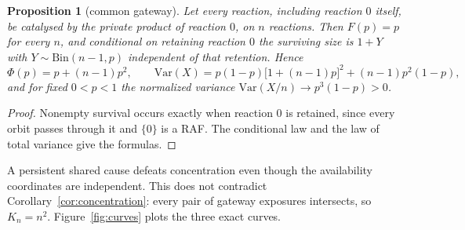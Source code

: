 \documentclass[11pt,a4paper]{article}
\theoremstyle{plain}
\newtheorem{proposition}[theorem]{Proposition}
\theoremstyle{definition}
\theoremstyle{remark}
\newcommand{\Var}{\mathrm{Var}}
\begin{document}
\begin{proposition}[common gateway]\label{prop:gateway}
Let every reaction, including reaction $0$ itself, be catalysed by the private product of reaction $0$, on $n$ reactions. Then $F(p)=p$ for every $n$, and conditional on retaining reaction $0$ the surviving size is $1+Y$ with $Y\sim\mathrm{Bin}(n-1,p)$ independent of that retention. Hence
\[
\Phi(p)=p+(n-1)p^{2},\qquad
\Var(X)=p(1-p)\big[1+(n-1)p\big]^{2}+(n-1)p^{2}(1-p),
\]
and for fixed $0<p<1$ the normalized variance $\Var(X/n)\to p^{3}(1-p)>0$.
\end{proposition}

\begin{proof}
Nonempty survival occurs exactly when reaction $0$ is retained, since every orbit passes through it and $\{0\}$ is a RAF. The conditional law and the law of total variance give the formulas.
\end{proof}

A persistent shared cause defeats concentration even though the availability coordinates are independent. This does not contradict Corollary~\ref{cor:concentration}: every pair of gateway exposures intersects, so $K_n=n^{2}$. Figure~\ref{fig:curves} plots the three exact curves.
\end{document}
